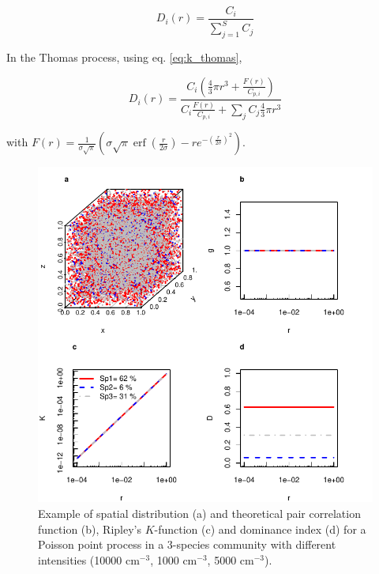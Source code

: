 \documentclass[english]{article}
\DeclareMathOperator\erf{erf}
\begin{document}
\begin{equation}
D_{i}(r)=\frac{C_{i}}{\sum_{j=1}^{S}C_{j}}
\end{equation}

In the Thomas process, using eq. \ref{eq:k_thomas}, 

\begin{equation}
D_{i}(r)=\frac{C_{i}\left(\frac{4}{3}\pi r^{3}+\frac{F(r)}{C_{p,i}}\right)}{C_{i}\frac{F(r)}{C_{p,i}}+\sum_{j}C_{j}\frac{4}{3}\pi r^{3}}
\end{equation}

with $F(r)=\frac{1}{\sigma\sqrt{\pi}}\left(\sigma\sqrt{\pi}\erf\left(\frac{r}{2\sigma}\right)-re^{-\left(\frac{r}{2\sigma}\right)^{2}}\right)$.

\begin{figure}[H]
\begin{centering}
\includegraphics[width=1\textwidth]{../code/figure/example_Poisson_distribution}
\par\end{centering}
\caption{Example of spatial distribution (a) and theoretical pair correlation
function (b), Ripley's $K$-function (c) and dominance index (d) for
a Poisson point process in a 3-species community with different intensities
(10000 cm$^{-3}$, 1000 cm$^{-3}$, 5000 cm$^{-3}$). \label{fig:Example-Poisson}}

\end{figure}
\end{document}
